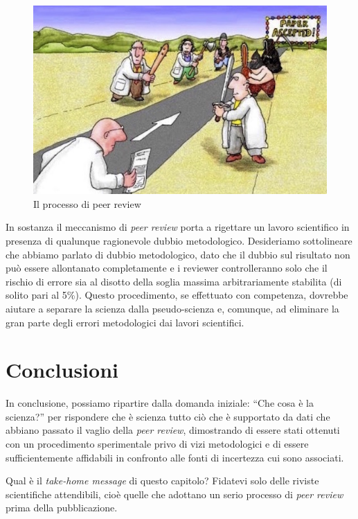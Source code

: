 \documentclass[a4paper,12pt,oneside]{book}
\begin{document}
\begin{figure}

{\centering \includegraphics[width=0.75\linewidth]{_images/PeerReview} 

}

\caption{Il processo di peer review}\label{fig:figName3}
\end{figure}

In sostanza il meccanismo di \emph{peer review} porta a rigettare un lavoro scientifico in presenza di qualunque ragionevole dubbio metodologico. Desideriamo sottolineare che abbiamo parlato di dubbio metodologico, dato che il dubbio sul risultato non può essere allontanato completamente e i reviewer controlleranno solo che il rischio di errore sia al disotto della soglia massima arbitrariamente stabilita (di solito pari al 5\%). Questo procedimento, se effettuato con competenza, dovrebbe aiutare a separare la scienza dalla pseudo-scienza e, comunque, ad eliminare la gran parte degli errori metodologici dai lavori scientifici.

\hypertarget{conclusioni}{%
\section{Conclusioni}\label{conclusioni}}

In conclusione, possiamo ripartire dalla domanda iniziale: ``Che cosa è la scienza?'' per rispondere che è scienza tutto ciò che è supportato da dati che abbiano passato il vaglio della \emph{peer review}, dimostrando di essere stati ottenuti con un procedimento sperimentale privo di vizi metodologici e di essere sufficientemente affidabili in confronto alle fonti di incertezza cui sono associati.

Qual è il \emph{take-home message} di questo capitolo? Fidatevi solo delle riviste scientifiche attendibili, cioè quelle che adottano un serio processo di \emph{peer review} prima della pubblicazione.
\end{document}
